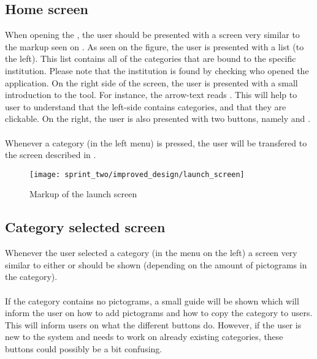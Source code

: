 
\subsection{Home screen}
\label{sec:home_screen}
When opening the \ct, the user should be presented with a screen very similar to the markup seen on . As seen on the figure, the user is presented with a list (to the left). This list contains all of the categories that are bound to the specific institution. Please note that the institution is found by checking who opened the application. On the right side of the screen, the user is presented with a small introduction to the tool. For instance, the arrow-text reads . This will help to user to understand that the left-side contains categories, and that they are clickable. On the right, the user is also presented with two buttons, namely  and .
\\\\
Whenever a category (in the left menu) is pressed, the user will be transfered to the screen described in .

\begin{figure}[!htbp]
    \centering
    \texttt{[image: sprint\_two/improved\_design/launch\_screen]}
    \caption{Markup of the launch screen}
    \label{fig:improved_design_launch_screen}
\end{figure}

\subsection{Category selected screen}
\label{sec:category_selected_screen}
Whenever the user selected a category (in the menu on the left) a screen very similar to either  or  should be shown (depending on the amount of pictograms in the category).
\\\\
If the category contains no pictograms, a small guide will be shown which will inform the user on how to add pictograms and how to copy the category to users. This will inform users on what the different buttons do. However, if the user is new to the system and needs to work on already existing categories, these buttons could possibly be a bit confusing. 


